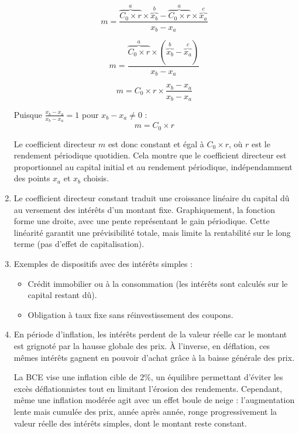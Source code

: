 \documentclass{article}
\begin{document}
\begin{enumerate}[label=\textbf{R1.\arabic*}]
                \[
                    m = \frac{\overset{a}{\overbrace{C_0 \times r}} \times \overset{b}{\overbrace{x_b}} - \overset{a}{\overbrace{C_0 \times r}} \times \overset{c}{\overbrace{x_a}}}{x_b - x_a}
                \]

                \[
                    m = \frac{\overset{a}{\overbrace{C_0 \times r}} \times (\overset{b}{\overbrace{x_b}} - \overset{c}{\overbrace{x_a}})}{x_b - x_a}
                \]

                \[
                    m = C_0 \times r \times \frac{x_b - x_a}{x_b - x_a}
                \]

                Puisque $\frac{x_b - x_a}{x_b - x_a} = 1$ pour $x_b - x_a \neq 0$ :
                \[
                    \boxed{m = C_0 \times r}
                \]

                Le coefficient directeur \( m \) est donc constant et égal à \( C_0 \times r \), où \( r \) est le rendement périodique quotidien. Cela montre que le coefficient directeur est proportionnel au capital initial et au rendement périodique, indépendamment des points \( x_a \) et \( x_b \) choisis.

                \item Le coefficient directeur constant traduit une croissance linéaire du capital dû au versement des intérêts d'un montant fixe. Graphiquement, la fonction forme une droite, avec une pente représentant le gain périodique. Cette linéarité garantit une prévisibilité totale, mais limite la rentabilité sur le long terme (pas d’effet de capitalisation).

                \item Exemples de dispositifs avec des intérêts simples :
                \begin{itemize}
                \item Crédit immobilier ou à la consommation (les intérêts  sont calculés sur le capital restant dû).
                \item Obligation à taux fixe sans réinvestissement des coupons.
                \end{itemize}

                \item En période d'inflation, les intérêts perdent de la valeur réelle car le montant est grignoté par la hausse globale des prix. À l’inverse, en déflation, ces mêmes intérêts gagnent en pouvoir d’achat grâce à la baisse générale des prix. 

                La BCE vise une inflation cible de \( 2\% \), un équilibre permettant d’éviter les excès déflationnistes tout en limitant l’érosion des rendements. Cependant, même une inflation modérée agit avec un effet boule de neige : l’augmentation lente mais cumulée des prix, année après année, ronge progressivement la valeur réelle des intérêts simples, dont le montant reste constant.


\end{enumerate}
\end{document}
